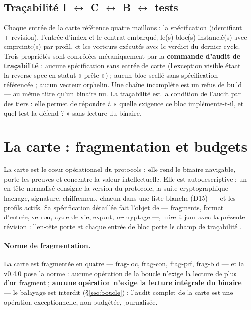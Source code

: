\subsection{Traçabilité I $\leftrightarrow$ C $\leftrightarrow$ B $\leftrightarrow$
tests}\label{sec:traceabilite}

Chaque entrée de la carte référence quatre maillons : la spécification (identifiant +
révision), l’entrée d’index et le contrat embarqué, le(s) bloc(s) instancié(s) avec
empreinte(s) par profil, et les vecteurs exécutés avec le verdict du dernier cycle. Trois
propriétés sont contrôlées mécaniquement par la \textbf{commande d’audit de traçabilité} :
aucune spécification sans entrée de carte (l’exception visible étant la reverse-spec en
statut « prête ») ; aucun bloc scellé sans spécification référencée ; aucun vecteur
orphelin. Une chaîne incomplète est un refus de build — au même titre qu’un binaire nu.
La traçabilité est la condition de l’audit par des tiers : elle permet de répondre à
« quelle exigence ce bloc implémente-t-il, et quel test la défend ? » sans lecture du
binaire.

\section{La carte : fragmentation et budgets}\label{sec:carte}

\begin{sloppypar}
La carte est le cœur opérationnel du protocole : elle rend le binaire navigable, porte les
preuves et concentre la valeur intellectuelle. Elle est autodescriptive : un en-tête
normalisé consigne la version du protocole, la suite cryptographique~— hachage, signature,
chiffrement, chacun dans une liste blanche (D15)~— et les profils actifs. Sa spécification
détaillée fait l’objet de  — fragments, format d’entrée, verrou,
cycle de vie, export, re-cryptage —, mise à jour avec la présente révision : l’en-tête
porte  et chaque entrée de bloc porte le champ de traçabilité
.
\end{sloppypar}

\paragraph{Norme de fragmentation.} La carte est fragmentée en quatre — frag-loc, frag-con,
frag-prf, frag-bld — et la v0.4.0 pose la norme : aucune opération de la boucle n’exige la
lecture de plus d’un fragment ; \textbf{aucune opération n’exige la lecture intégrale du
binaire} — le balayage est interdit (§\ref{sec:boucle}) ; l’audit complet de la carte est
une opération exceptionnelle, non budgétée, journalisée.

